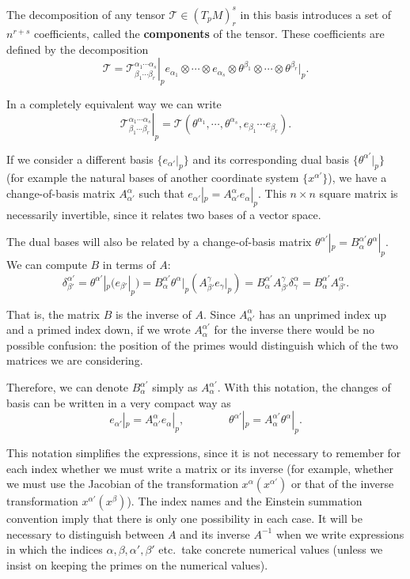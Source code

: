 \begin{points}
\item The decomposition of any tensor $\mathcal T\in(T_pM)^s_r$ in this basis introduces a set of $n^{r+s}$ coefficients, called the \textbf{components} of the tensor. These coefficients are defined by the decomposition
\[
  \mathcal T=\left.\mathcal T^{\alpha_1\cdots\alpha_s}_{\beta_1\cdots\beta_r}\right|_pe_{\alpha_1}\otimes\cdots\otimes e_{\alpha_s}\otimes\theta^{\beta_1}\otimes\cdots\otimes\theta^{\beta_r}|_p .
\]

\item In a completely equivalent way we can write
\[
  \left.\mathcal T^{\alpha_1\cdots\alpha_s}_{\beta_1\cdots\beta_r}\right|_p=\mathcal T(\theta^{\alpha_1},\cdots,\theta^{\alpha_s},e_{\beta_1}\cdots e_{\beta_r}).
\]

\item If we consider a different basis $\{e_{\alpha'}|_p\}$ and its corresponding dual basis $\{\theta^{\alpha'}|_p\}$ (for example the natural bases of another coordinate system $\{x^{\alpha'}\}$), we have a change-of-basis matrix $A^\alpha_{\alpha'}$ such that $e_{\alpha'}|_p=A^\alpha_{\alpha'}e_\alpha|_p$. This $n\times n$ square matrix is necessarily invertible, since it relates two bases of a vector space.

\item The dual bases will also be related by a change-of-basis matrix $\theta^{\alpha'}|_p=B^{\alpha'}_\alpha\theta^\alpha|_p$. We can compute $B$ in terms of $A$:
\[
  \delta^{\alpha'}_{\beta'}=\theta^{\alpha'}|_p(e_{\beta'}|_p)=B^{\alpha'}_\alpha\theta^\alpha|_p\left(A^\gamma_{\beta'}e_\gamma|_p\right)=B^{\alpha'}_\alpha A^\gamma_{\beta'}\delta^\alpha_\gamma=B^{\alpha'}_\alpha A^\alpha_{\beta'} .
\]

\item That is, the matrix $B$ is the inverse of $A$. Since $A^\alpha_{\alpha'}$ has an unprimed index up and a primed index down, if we wrote $A^{\alpha'}_\alpha$ for the inverse there would be no possible confusion: the position of the primes would distinguish which of the two matrices we are considering.

\item Therefore, we can denote $B^{\alpha'}_\alpha$ simply as $A^{\alpha'}_\alpha$. With this notation, the changes of basis can be written in a very compact way as
\[
  e_{\alpha'}|_p=A^\alpha_{\alpha'}e_\alpha|_p,\qquad\qquad\theta^{\alpha'}|_p=A^{\alpha'}_\alpha\theta^\alpha|_p .
\]

\item This notation simplifies the expressions, since it is not necessary to remember for each index whether we must write a matrix or its inverse (for example, whether we must use the Jacobian of the transformation $x^\alpha(x^{\alpha'})$ or that of the inverse transformation $x^{\alpha'}(x^\beta)$). The index names and the Einstein summation convention imply that there is only one possibility in each case. It will be necessary to distinguish between $A$ and its inverse $A^{-1}$ when we write expressions in which the indices $\alpha,\beta,\alpha',\beta'$ etc.\ take concrete numerical values (unless we insist on keeping the primes on the numerical values).


\end{points}
